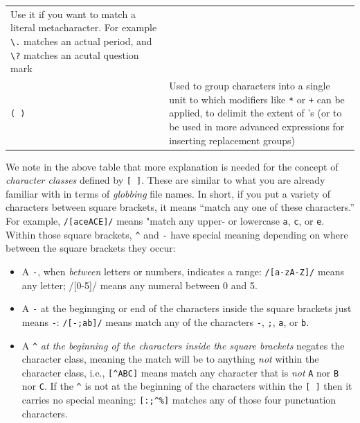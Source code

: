 \documentclass[]{krantz}
\providecommand{\tightlist}{%
  \setlength{\itemsep}{0pt}\setlength{\parskip}{0pt}}
\begin{document}
\begin{longtable}[]{@{}ll@{}}
\begin{minipage}[t]{0.43\columnwidth}
Use it if you want to match a
literal metacharacter. For
example \texttt{\textbackslash{}.} matches an actual
period, and \texttt{\textbackslash{}?} matches an
acutal question mark\strut
\end{minipage}\tabularnewline
\begin{minipage}[t]{0.25\columnwidth}\raggedright
\texttt{(\ )}\strut
\end{minipage} & \begin{minipage}[t]{0.43\columnwidth}\raggedright
Used to group characters into
a single unit to which
modifiers like \texttt{*} or \texttt{+} can
be applied, to delimit the
extent of \texttt{\textbar{}}'s (or to be used
in more advanced expressions
for inserting replacement
groups)\strut
\end{minipage}\tabularnewline
\bottomrule
\end{longtable}

We note in the above table that more explanation is needed for the concept of \emph{character classes} defined by \texttt{{[}\ {]}}.
These are similar to what you are already
familiar with in terms of \emph{globbing} file names. In short, if you
put a variety of characters between square brackets, it means ``match any one of these characters.''
For example, \texttt{/{[}aceACE{]}/} means "match any upper- or lowercase \texttt{a}, \texttt{c}, or \texttt{e}. Within
those square brackets, \texttt{\^{}} and \texttt{-} have special meaning depending on where between
the square brackets they occur:

\begin{itemize}
\tightlist
\item
  A \texttt{-}, when \emph{between} letters or numbers, indicates a range: \texttt{/{[}a-zA-Z{]}/} means any letter;
  /{[}0-5{]}/ means any numeral between 0 and 5.
\item
  A \texttt{-} at the beginnging or end of the characters inside the square brackets just means \texttt{-}: \texttt{/{[}-;ab{]}/} means
  match any of the characters \texttt{-}, \texttt{;}, \texttt{a}, or \texttt{b}.
\item
  A \texttt{\^{}} \emph{at the beginning of the characters inside the square brackets} negates the character class, meaning
  the match will be to anything \emph{not} within the character class, i.e., \texttt{{[}\^{}ABC{]}} means match any character
  that is \emph{not} \texttt{A} nor \texttt{B} nor \texttt{C}. If the \texttt{\^{}} is not at the beginning of the characters within the \texttt{{[}\ {]}}
  then it carries no special meaning: \texttt{{[}:;\^{}\%{]}} matches any of those four punctuation characters.
\end{itemize}
\end{document}
